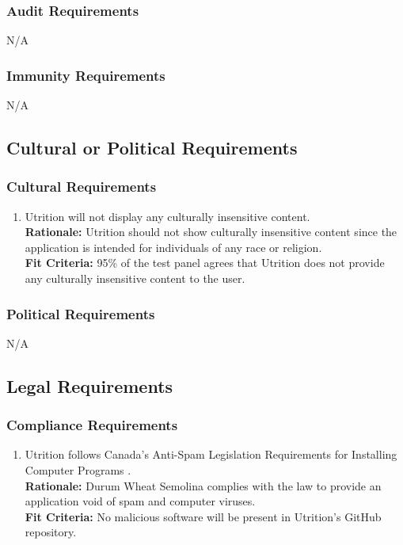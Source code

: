 \documentclass[12pt]{article}
\begin{document}
\subsubsection{Audit Requirements}
\hspace{1.5cm}N/A 

\subsubsection{Immunity Requirements}
\hspace{1.5cm}N/A 

\subsection{Cultural or Political Requirements}

\subsubsection{Cultural Requirements}

\begin{enumerate}[{CP}1. ] 
	\item Utrition will not display any culturally insensitive content. \\
	\textbf{Rationale:} Utrition should not show culturally insensitive content since the application is intended for individuals of any race or religion.\\	
	\textbf{Fit Criteria:} 95\% of the test panel agrees that Utrition does not provide any culturally insensitive content to the user.
\end{enumerate}

\subsubsection{Political Requirements}
\hspace{1.5cm}N/A

\subsection{Legal Requirements}
\subsubsection{Compliance Requirements}
\begin{enumerate}[{LR}1. ]
	\item Utrition follows Canada’s Anti-Spam Legislation Requirements for Installing Computer Programs \citep{CanadianInstall}.\\
	\textbf{Rationale:} Durum Wheat Semolina complies with the law to provide an application void of spam and computer viruses.\\
	\textbf{Fit Criteria:} No malicious software will be present in Utrition’s GitHub repository.
\end{enumerate}
\end{document}
